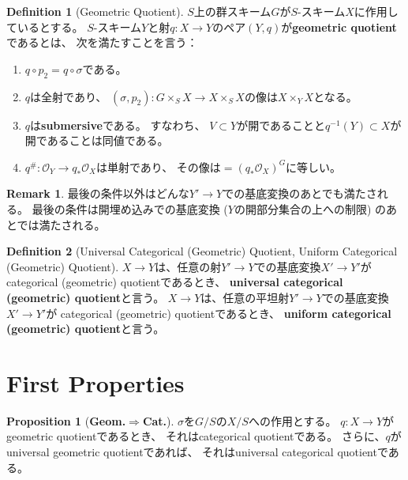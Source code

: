 \documentclass[uplatex]{jsarticle}
\theoremstyle{definition}
\newtheorem{prop}[prop]{Proposition}
\newtheorem{defi}[defi]{Definition}
\newtheorem*{rem*}{Remark}
\newcommand{\mcO}{\mathcal{O}}
\begin{document}
\begin{defi}[Geometric Quotient]
  \(S\)上の群スキーム\(G\)が\(S\)-スキーム\(X\)に作用しているとする。
  \(S\)-スキーム\(Y\)と射\(q:X\to Y\)のペア\((Y,q)\)が\textbf{geometric quotient}であるとは、
  次を満たすことを言う：
  \begin{enumerate}
    \item
    \(q\circ p_2 = q \circ \sigma\)である。
    \item
    \(q\)は全射であり、
    \((\sigma,p_2): G\times_S X \to X\times_S X\)の像は\(X\times_Y X\)となる。
    \item
    \(q\)は\textbf{submersive}である。
    すなわち、
    \(V\subset Y\)が開であることと\(q^{-1}(Y)\subset X\)が開であることは同値である。
    \item
    \(q^{\#}:\mcO_Y \to q_*\mcO_X\)は単射であり、
    その像は\( = (q_*\mcO_X)^G\)に等しい。
  \end{enumerate}
\end{defi}



\begin{rem*}
  最後の条件以外はどんな\(Y'\to Y\)での基底変換のあとでも満たされる。
  最後の条件は開埋め込みでの基底変換 (\(Y\)の開部分集合の上への制限) のあとでは満たされる。
\end{rem*}




\begin{defi}[Universal Categorical (Geometric) Quotient, Uniform Categorical (Geometric) Quotient]
  \(X\to Y\)は、任意の射\(Y'\to Y\)での基底変換\(X'\to Y'\)が
  categorical (geometric) quotientであるとき、
  \textbf{universal categorical (geometric) quotient}と言う。
  \(X\to Y\)は、任意の平坦射\(Y'\to Y\)での基底変換\(X'\to Y'\)が
  categorical (geometric) quotientであるとき、
  \textbf{uniform categorical (geometric) quotient}と言う。
\end{defi}









\section{First Properties}




\begin{prop}[\textbf{Geom.\(\Rightarrow\)Cat.}]
  \(\sigma\)を\(G/S\)の\(X/S\)への作用とする。
  \(q:X\to Y\)がgeometric quotientであるとき、
  それはcategorical quotientである。
  さらに、\(q\)がuniversal geometric quotientであれば、
  それはuniversal categorical quotientである。
\end{prop}
\end{document}
